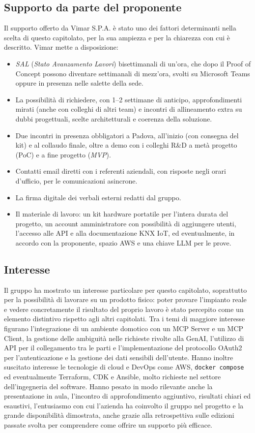 \documentclass[11pt, a4paper]{article}
\begin{document}
\subsection{Supporto da parte del proponente}
Il supporto offerto da Vimar S.P.A. è stato uno dei fattori determinanti nella scelta di questo capitolato, per la sua ampiezza e per la chiarezza con cui è descritto. Vimar mette a disposizione:
\begin{itemize}
    \item \textit{SAL} (\textit{Stato Avanzamento Lavori}) bisettimanali di un'ora, che dopo il Proof of Concept possono diventare settimanali di mezz'ora, svolti su Microsoft Teams oppure in presenza nelle salette della sede.
    \item La possibilità di richiedere, con 1--2 settimane di anticipo, approfondimenti mirati (anche con colleghi di altri team) e incontri di allineamento extra su dubbi progettuali, scelte architetturali e coerenza della soluzione.
    \item Due incontri in presenza obbligatori a Padova, all'inizio (con consegna del kit) e al collaudo finale, oltre a demo con i colleghi R\&D a metà progetto (PoC) e a fine progetto (\textit{MVP}).
    \item Contatti email diretti con i referenti aziendali, con risposte negli orari d'ufficio, per le comunicazioni asincrone.
    \item La firma digitale dei verbali esterni redatti dal gruppo.
    \item Il materiale di lavoro: un kit hardware portatile per l'intera durata del progetto, un account amministratore con possibilità di aggiungere utenti, l'accesso alle API e alla documentazione KNX IoT, ed eventualmente, in accordo con la proponente, spazio AWS e una chiave LLM per le prove.
\end{itemize}

\subsection{Interesse}
Il gruppo ha mostrato un interesse particolare per questo capitolato, soprattutto per la possibilità di lavorare su un prodotto fisico: poter provare l'impianto reale e vedere concretamente il risultato del proprio lavoro è stato percepito come un elemento distintivo rispetto agli altri capitolati. Tra i temi di maggiore interesse figurano l'integrazione di un ambiente domotico con un MCP Server e un MCP Client, la gestione delle ambiguità nelle richieste rivolte alla GenAI, l'utilizzo di API per il collegamento tra le parti e l'implementazione del protocollo OAuth2 per l'autenticazione e la gestione dei dati sensibili dell'utente. Hanno inoltre suscitato interesse le tecnologie di cloud e DevOps come AWS, \texttt{docker compose} ed eventualmente Terraform, CDK e Ansible, molto richieste nel settore dell'ingegneria del software. Hanno pesato in modo rilevante anche la presentazione in aula, l'incontro di approfondimento aggiuntivo, risultati chiari ed esaustivi, l'entusiasmo con cui l'azienda ha coinvolto il gruppo nel progetto e la grande disponibilità dimostrata, anche grazie alla retrospettiva sulle edizioni passate svolta per comprendere come offrire un supporto più efficace.
\end{document}
